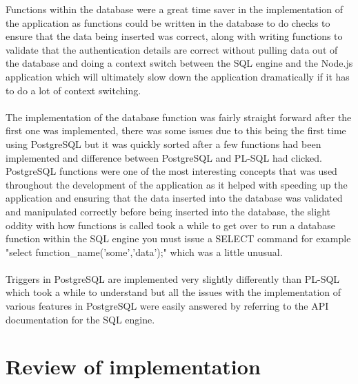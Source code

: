 Functions within the database were a great time saver in the implementation of the application as functions could be written in the database to do checks to ensure that the data being inserted was correct, along with writing functions to validate that the authentication details are correct without pulling data out of the database and doing a context switch between the SQL engine and the Node.js application which will ultimately slow down the application dramatically if it has to do a lot of context switching.\\
\\
The implementation of the database function was fairly straight forward after the first one was implemented, there was some issues due to this being the first time using PostgreSQL but it was quickly sorted after a few functions had been implemented and difference between PostgreSQL and PL-SQL had clicked. PostgreSQL functions were one of the most interesting concepts that was used throughout the development of the application as it helped with speeding up the application and ensuring that the data inserted into the database was validated and manipulated correctly before being inserted into the database, the slight oddity with how functions is called took a while to get over to run a database function within the SQL engine you must issue a SELECT command for example "select function\_name('some','data');" which was a little unusual.\\
\\
Triggers in PostgreSQL are implemented very slightly differently than PL-SQL which took a while to understand but all the issues with the implementation of various features in PostgreSQL were easily answered by referring to the API documentation \cite{Postgres:APIDocumentation:2015:online} for the SQL engine.

\section{Review of implementation}

